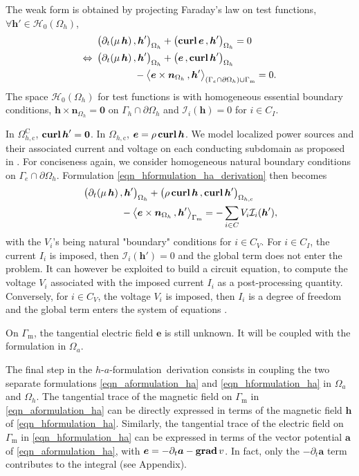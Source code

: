 \documentclass[journal]{IEEEtran}
\renewcommand{\vec}[1]{\boldsymbol{#1}} %
\newcommand{\paren}[1]{\left(#1\right)}
\newcommand{\parenangle}[1]{\left\langle#1\right\rangle}
\newcommand{\volInt}[3]{\paren{#1 \, , #2}_{#3}}
\newcommand{\surInt}[3]{\parenangle{#1 \, , #2}_{#3}}
\newcommand{\grad}{\text{\textbf{grad}}\, }
\newcommand{\curl}{\text{\textbf{curl}}\, }
\renewcommand{\a}{\vec a}
\newcommand{\n}{\vec n}
\newcommand{\h}{\vec h}
\newcommand{\e}{\vec e}
\newcommand{\dt}{\partial_t}
\newcommand{\Oa}{\Omega_a}
\newcommand{\Oh}{\Omega_h}
\newcommand{\Ohc}{\Omega_{h,\text{c}}}
\newcommand{\Ohcc}{\Omega_{h,\text{c}}^{\text{C}}}
\newcommand{\Gm}{\Gamma_\text{m}}
\newcommand{\haf}{$h$-$a$-formulation\ }
\newcommand{\hspz}{\mathcal{H}_{0}}
\begin{document}
The weak form is obtained by projecting Faraday's law on test functions, $\forall \h'\in \hspz(\Oh)$,
\begin{align}
& \volInt{\dt(\mu\, \h)}{\h'}{\Oh} + \volInt{\curl \e}{\h'}{\Oh} = 0\notag\\
\Leftrightarrow\ & \volInt{\dt(\mu\, \h)}{\h'}{\Oh} + \volInt{\e}{\curl \h'}{\Oh}\notag \\
&\qquad\qquad-\surInt{\e \times \n_{\Oh}}{\h'}{(\Gamma_e\cap \partial \Oh)\cup \Gm}= 0.
\label{eqn_hformulation_ha_derivation}
\end{align}
The space $\hspz(\Oh)$ for test functions is with homogeneous essential boundary conditions, $\h \times \n_{\Oh} = \vec 0$ on $\Gamma_h\cap \partial \Oh$ and $\mathcal{I}_i(\h) = 0$ for $i\in C_I$.

In $\Ohcc$, $\curl \h'=\vec 0$. In $\Ohc$, $\e = \rho\, \curl \h$. We model localized power sources and their associated current and voltage on each conducting subdomain as proposed in \cite{dular1994phd,dular1999global}. For conciseness again, we consider homogeneous natural boundary conditions on $\Gamma_e\cap \partial \Oh$. Formulation \eqref{eqn_hformulation_ha_derivation} then becomes
\begin{align}\label{eqn_hformulation_ha}
& \volInt{\dt(\mu\, \h)}{\h'}{\Oh} + \volInt{\rho\,\curl \h}{\curl \h'}{\Ohc}\notag \\
&\qquad\qquad-\surInt{\e \times \n_{\Oh}}{\h'}{\Gm}=  -\sum_{i\in C} V_i \mathcal{I}_i(\h'),
\end{align}
with the $V_i$'s being natural "boundary" conditions for $i\in C_V$. For $i\in C_I$, the current $I_i$ is imposed, then $\mathcal{I}_i(\h') = 0$ and the global term does not enter the problem. It can however be exploited to build a circuit equation, to compute the voltage $V_i$ associated with the imposed current $I_i$ as a post-processing quantity. Conversely, for $i\in C_V$, the voltage $V_i$ is imposed, then $I_i$ is a degree of freedom and the global term enters the system of equations \cite{dular1999global}.

On $\Gm$, the tangential electric field $\e$ is still unknown. It will be coupled with the formulation in $\Oa$.

The final step in the \haf derivation consists in coupling the two separate formulations \eqref{eqn_aformulation_ha} and \eqref{eqn_hformulation_ha} in $\Oa$ and $\Oh$. The tangential trace of the magnetic field on $\Gm$ in \eqref{eqn_aformulation_ha} can be directly expressed in terms of the magnetic field $\h$ of \eqref{eqn_hformulation_ha}. Similarly, the tangential trace of the electric field on $\Gm$ in \eqref{eqn_hformulation_ha} can be expressed in terms of the vector potential $\a$ of \eqref{eqn_aformulation_ha}, with $\e = -\dt \a - \grad v$. In fact, only the $-\dt \a$ term contributes to the integral (see Appendix).
\end{document}
